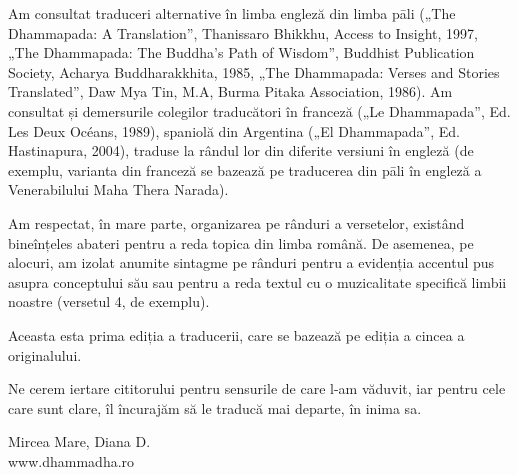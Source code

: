 Am consultat traduceri alternative în limba engleză din limba pāli („The Dhammapada: A Translation”, Thanissaro Bhikkhu, Access to Insight, 1997, „The Dhammapada: The Buddha's Path of Wisdom”, Buddhist Publication Society, Acharya Buddharakkhita, 1985, „The Dhammapada: Verses and Stories Translated”, Daw Mya Tin, M.A, Burma Pitaka Association, 1986). Am consultat și demersurile colegilor traducători în franceză („Le Dhammapada”, Ed. Les Deux Océans, 1989), spaniolă din Argentina („El Dhammapada”, Ed. Hastinapura, 2004), traduse la rândul lor din diferite versiuni în engleză (de exemplu, varianta din franceză se bazează pe traducerea din pāli în engleză a Venerabilului Maha Thera Narada).

Am respectat, în mare parte, organizarea pe rânduri a versetelor, existând bineînțeles abateri pentru a reda topica din limba română. De asemenea, pe alocuri, am izolat anumite sintagme pe rânduri pentru a evidenția accentul pus asupra conceptului său sau pentru a reda textul cu o
muzicalitate specifică limbii noastre (versetul 4, de exemplu).

Aceasta esta prima ediția a traducerii, care se bazează pe ediția a cincea a originalului.

Ne cerem iertare cititorului pentru sensurile de care l-am văduvit, iar pentru cele care sunt clare, îl încurajăm să le traducă mai departe, în inima sa.

\bigskip

{\raggedleft
Mircea Mare, Diana D.\\
www.dhammadha.ro
\par}
